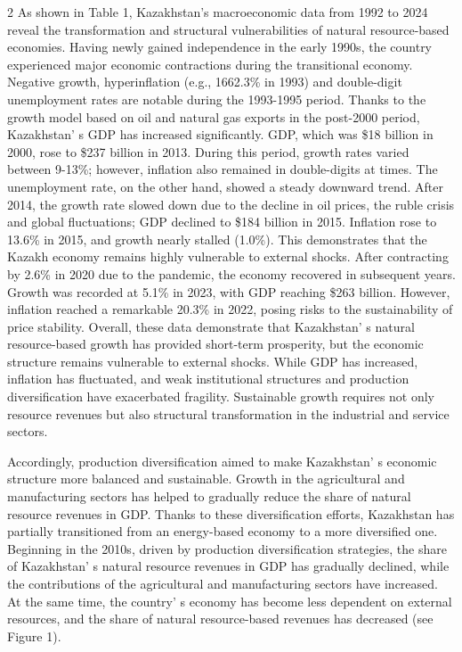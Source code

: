 \begin{multicols}{2}
As shown in Table 1, Kazakhstan's macroeconomic data
from 1992 to 2024 reveal the transformation and structural
vulnerabilities of natural resource-based economies. Having newly gained
independence in the early 1990s, the country experienced major economic
contractions during the transitional economy. Negative growth,
hyperinflation (e.g., 1662.3\% in 1993) and double-digit unemployment
rates are notable during the 1993-1995 period. Thanks to the growth
model based on oil and natural gas exports in the post-2000 period,
Kazakhstan' s GDP has increased significantly. GDP, which
was \$18 billion in 2000, rose to \$237 billion in 2013. During this
period, growth rates varied between 9-13\%; however, inflation also
remained in double-digits at times. The unemployment rate, on the other
hand, showed a steady downward trend. After 2014, the growth rate slowed
down due to the decline in oil prices, the ruble crisis and global
fluctuations; GDP declined to \$184 billion in 2015. Inflation rose to
13.6\% in 2015, and growth nearly stalled (1.0\%). This demonstrates
that the Kazakh economy remains highly vulnerable to external shocks.
After contracting by 2.6\% in 2020 due to the pandemic, the economy
recovered in subsequent years. Growth was recorded at 5.1\% in 2023,
with GDP reaching \$263 billion. However, inflation reached a remarkable
20.3\% in 2022, posing risks to the sustainability of price stability.
Overall, these data demonstrate that Kazakhstan' s
natural resource-based growth has provided short-term prosperity, but
the economic structure remains vulnerable to external shocks. While GDP
has increased, inflation has fluctuated, and weak institutional
structures and production diversification have exacerbated fragility.
Sustainable growth requires not only resource revenues but also
structural transformation in the industrial and service sectors.

Accordingly, production diversification aimed to make
Kazakhstan' s economic structure more balanced and
sustainable. Growth in the agricultural and manufacturing sectors has
helped to gradually reduce the share of natural resource revenues in
GDP. Thanks to these diversification efforts, Kazakhstan has partially
transitioned from an energy-based economy to a more diversified one.
Beginning in the 2010s, driven by production diversification strategies,
the share of Kazakhstan' s natural resource revenues in
GDP has gradually declined, while the contributions of the agricultural
and manufacturing sectors have increased. At the same time, the
country' s economy has become less dependent on external
resources, and the share of natural resource-based revenues has
decreased (see Figure 1).


\end{multicols}

